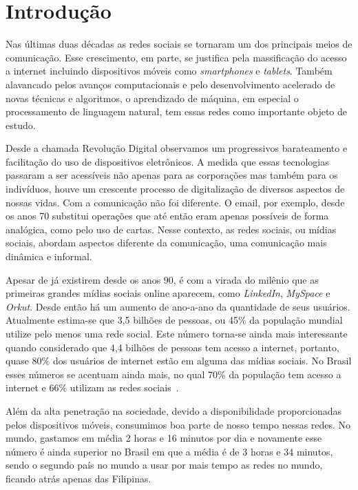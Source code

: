\chapter{Introdução}

Nas últimas duas décadas as redes sociais se tornaram um dos principais meios de
comunicação.
Esse crescimento, em parte, se justifica pela massificação do acesso a internet
incluindo dispositivos móveis como \textit{smartphones} e \textit{tablets}.
Também alavancado pelos avanços computacionais e pelo desenvolvimento acelerado
de novas técnicas e algoritmos, o aprendizado de máquina, em especial o
processamento de linguagem natural, tem essas redes como importante objeto de
estudo.

Desde a chamada Revolução Digital observamos um progressivos barateamento e
facilitação do uso de dispositivos eletrônicos.
A medida que essas tecnologias passaram a ser acessíveis não apenas para as
corporações mas também para os indivíduos, houve um crescente processo de
digitalização de diversos aspectos de nossas vidas.
Com a comunicação não foi diferente.
O email, por exemplo, desde os anos 70 substitui operações que até então eram
apenas possíveis de forma analógica, como pelo uso de cartas.
Nesse contexto, as redes sociais, ou mídias sociais, abordam aspectos diferente
da comunicação, uma comunicação mais dinâmica e informal.

Apesar de já existirem desde os anos 90, é com a virada do milênio que as
primeiras grandes mídias sociais online aparecem, como \textit{LinkedIn},
\textit{MySpace} e \textit{Orkut}.
Desde então há um aumento de ano-a-ano da quantidade de seus usuários.
Atualmente estima-se que 3,5 bilhões de pessoas, ou 45\% da população mundial
utilize pelo menos uma rede social.
Este número torna-se ainda mais interessante quando considerado que 4,4 bilhões
de pessoas tem acesso a internet, portanto, quase 80\% dos usuários de internet
estão em alguma das mídias sociais.
No Brasil esses números se acentuam ainda mais, no qual 70\% da população tem
acesso a internet e 66\% utilizam as redes sociais~\cite{social19}.

Além da alta penetração na sociedade, devido a disponibilidade proporcionadas
pelos dispositivos móveis, consumimos boa parte de nosso tempo nessas redes.
No mundo, gastamos em média 2 horas e 16 minutos por dia e novamente esse número
é ainda superior no Brasil em que a média é de 3 horas e 34 minutos, sendo o
segundo país no mundo a usar por mais tempo as redes no mundo, ficando atrás
apenas das Filipinas.

